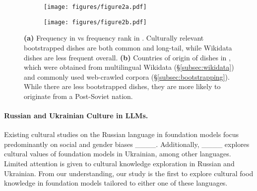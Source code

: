 \begin{figure*}[t]
    \centering
    \begin{subfigure}[t]{0.333\linewidth}
        \centering
        \texttt{[image: figures/figure2a.pdf]}
        \caption{}
        \label{fig:figure2a}
    \end{subfigure}%
    \hfill
    \begin{subfigure}[t]{0.666\linewidth}
        \centering
        \texttt{[image: figures/figure2b.pdf]}
        \caption{}
        \label{fig:figure2b}
    \end{subfigure}
\caption{
        \textbf{(a)} Frequency in  vs frequency rank in \benchmarkname{}. Culturally relevant bootstrapped dishes are both common and long-tail, while Wikidata dishes are less frequent overall. \textbf{(b)} Countries of origin of dishes in \benchmarkname{}, which were obtained from multilingual Wikidata  (\S\ref{subsec:wikidata}) and commonly used web-crawled corpora (\S\ref{subsec:bootstrapping}). While there are less bootstrapped dishes, they are more likely to originate from a Post-Soviet nation.
    }
    \vspace{-0.3cm}
    \label{fig:map_comparisons}
\end{figure*}

\paragraph{Russian and Ukrainian Culture in LLMs.} 
Existing cultural studies on the Russian language in foundation models focus predominantly on social and gender biases ____. Additionally, ____ explores cultural values of foundation models in Ukrainian, among other languages. Limited attention is given to cultural knowledge exploration in Russian and Ukrainian. From our understanding, our study is the first to explore cultural food knowledge in foundation models tailored to either one of these languages.